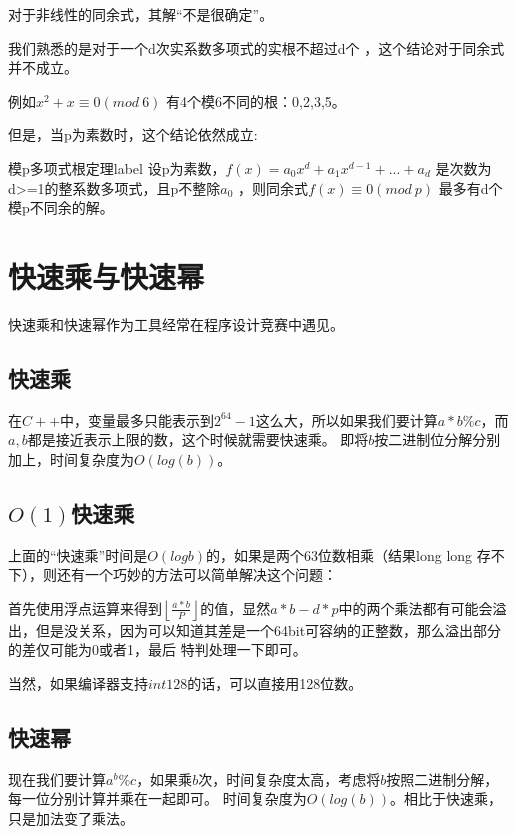 

\vbox{}

对于非线性的同余式，其解“不是很确定”。

我们熟悉的是对于{\heiti 一个d次实系数多项式的实根不超过d个} ，这个结论对于同余式并不成立。

例如$x^2+x\equiv 0(mod\ 6)$ 有4个模6不同的根：0,2,3,5。

但是，{\heiti 当p为素数时，这个结论依然成立:}

\begin{theorem}{模p多项式根定理}{label}
设p为素数，$f(x)=a_0x^d+a_1x^{d-1}+...+a_d$ 是次数为d>=1的整系数多项式，且p不整除$a_0$ ，则同余式$f(x)\equiv 0(mod\ p)$ 最多有d个模p不同余的解。
\end{theorem}

\section{快速乘与快速幂}
快速乘和快速幂作为工具经常在程序设计竞赛中遇见。
\subsection{快速乘}
在$C++$中，变量最多只能表示到$2^{64}-1$这么大，所以如果我们要计算$a*b\%c$，而$a,b$都是接近表示上限的数，这个时候就需要快速乘。
即将$b$按二进制位分解分别加上，时间复杂度为$O(log(b))$。


\subsection{$O(1)$快速乘}
上面的“快速乘”时间是$O(logb)$的，如果是两个63位数相乘（结果long long 存不下），则还有一个巧妙的方法可以简单解决这个问题：



首先使用浮点运算来得到$\left\lfloor\frac{a * b}{P}\right\rfloor$的值，显然$a*b-d*p$中的两个乘法都有可能会溢出，但是没关系，因为可以知道其差是一个64bit可容纳的正整数，那么溢出部分的差仅可能为0或者1，最后
特判处理一下即可。	
\begin{note}
	当然，如果编译器支持$int128$的话，可以直接用128位数。
\end{note}

\subsection{快速幂}
现在我们要计算$a^b\%c$，如果乘$b$次，时间复杂度太高，考虑将$b$按照二进制分解，每一位分别计算并乘在一起即可。
时间复杂度为$O(log(b))$。相比于快速乘，只是加法变了乘法。


